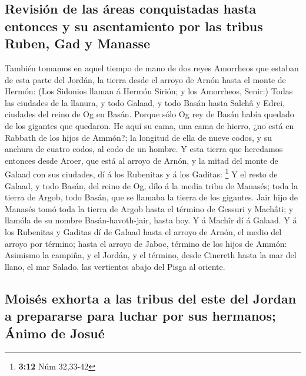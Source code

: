 \hypertarget{revisiuxf3n-de-las-uxe1reas-conquistadas-hasta-entonces-y-su-asentamiento-por-las-tribus-ruben-gad-y-manasse}{%
\subsection{Revisión de las áreas conquistadas hasta entonces y su
asentamiento por las tribus Ruben, Gad y
Manasse}\label{revisiuxf3n-de-las-uxe1reas-conquistadas-hasta-entonces-y-su-asentamiento-por-las-tribus-ruben-gad-y-manasse}}

 También tomamos en aquel tiempo de mano de dos reyes
Amorrheos que estaban de esta parte del Jordán, la tierra desde el
arroyo de Arnón hasta el monte de Hermón:  (Los Sidonios
llaman á Hermón Sirión; y los Amorrheos, Senir:)  Todas
las ciudades de la llanura, y todo Galaad, y todo Basán hasta Salchâ y
Edrei, ciudades del reino de Og en Basán.  Porque sólo Og
rey de Basán había quedado de los gigantes que quedaron. He aquí su
cama, una cama de hierro, ¿no está en Rabbath de los hijos de Ammón?; la
longitud de ella de nueve codos, y su anchura de cuatro codos, al codo
de un hombre.  Y esta tierra que heredamos entonces desde
Aroer, que está al arroyo de Arnón, y la mitad del monte de Galaad con
sus ciudades, dí á los Rubenitas y á los Gaditas: \footnote{\textbf{3:12}
  Núm 32,33-42}  Y el resto de Galaad, y todo Basán, del
reino de Og, dílo á la media tribu de Manasés; toda la tierra de Argob,
todo Basán, que se llamaba la tierra de los gigantes. 
Jair hijo de Manasés tomó toda la tierra de Argob hasta el término de
Gessuri y Machâti; y llamóla de su nombre Basán-havoth-jair, hasta hoy.
 Y á Machîr dí á Galaad.  Y á los
Rubenitas y Gaditas dí de Galaad hasta el arroyo de Arnón, el medio del
arroyo por término; hasta el arroyo de Jaboc, término de los hijos de
Ammón:  Asimismo la campiña, y el Jordán, y el término,
desde Cinereth hasta la mar del llano, el mar Salado, las vertientes
abajo del Pisga al oriente.

\hypertarget{moisuxe9s-exhorta-a-las-tribus-del-este-del-jordan-a-prepararse-para-luchar-por-sus-hermanos-uxe1nimo-de-josuuxe9}{%
\subsection{Moisés exhorta a las tribus del este del Jordan a prepararse
para luchar por sus hermanos; Ánimo de
Josué}\label{moisuxe9s-exhorta-a-las-tribus-del-este-del-jordan-a-prepararse-para-luchar-por-sus-hermanos-uxe1nimo-de-josuuxe9}}

